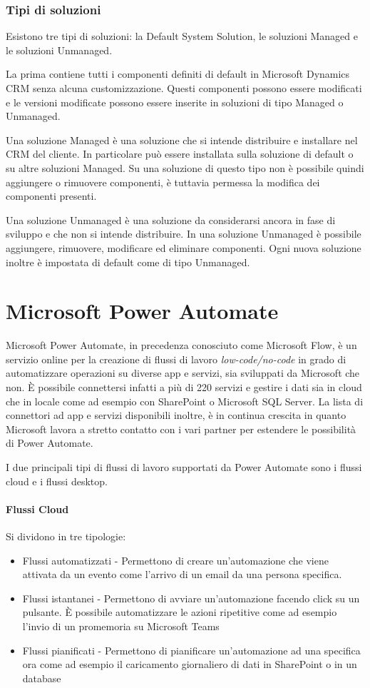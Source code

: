 \subsubsection{Tipi di soluzioni}
Esistono tre tipi di soluzioni: la Default System Solution, le soluzioni Managed e le soluzioni Unmanaged.

La prima contiene tutti i componenti definiti di default in Microsoft Dynamics CRM senza alcuna customizzazione. Questi componenti possono essere modificati e le versioni modificate possono essere inserite in soluzioni di tipo Managed o Unmanaged.

Una soluzione Managed è una soluzione che si intende distribuire e installare nel CRM del cliente. In particolare può essere installata sulla soluzione di default o su altre soluzioni Managed. Su una soluzione di questo tipo non è possibile quindi aggiungere o rimuovere componenti, è tuttavia permessa la modifica dei componenti presenti.

Una soluzione Unmanaged è una soluzione da considerarsi ancora in fase di sviluppo e che non si intende distribuire. In una soluzione Unmanaged è possibile aggiungere, rimuovere, modificare ed eliminare componenti. Ogni nuova soluzione inoltre è impostata di default come di tipo Unmanaged.~\cite{DynamicsTutorialspoint}

\section{Microsoft Power Automate}
Microsoft Power Automate, in precedenza conosciuto come Microsoft Flow, è un servizio online per la creazione di flussi di lavoro \textit{low-code/no-code} in grado di automatizzare operazioni su diverse app e servizi, sia sviluppati da Microsoft che non.
È possibile connettersi infatti a più di 220 servizi e gestire i dati sia in cloud che in locale come ad esempio con SharePoint o Microsoft SQL Server. La lista di connettori ad app e servizi disponibili inoltre, è in continua crescita in quanto Microsoft lavora a stretto contatto con i vari partner per estendere le possibilità di Power Automate.~\cite{FlussiPowerAutomate}

I due principali tipi di flussi di lavoro supportati da Power Automate sono i flussi cloud e i flussi desktop.
\paragraph{Flussi Cloud} Si dividono in tre tipologie:
\begin{itemize}
  \item Flussi automatizzati - Permettono di creare un'automazione che viene attivata da un evento come l'arrivo di un email da una persona specifica. 
  \item Flussi istantanei - Permettono di avviare un'automazione facendo click su un pulsante. È possibile automatizzare le azioni ripetitive come ad esempio l'invio di un promemoria su Microsoft Teams
  \item Flussi pianificati - Permettono di pianificare un'automazione ad una specifica ora come ad esempio il caricamento giornaliero di dati in SharePoint o in un database
\end{itemize}

